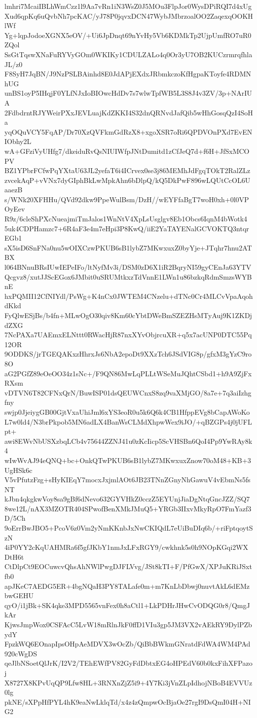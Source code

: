 lmhri7McaiIBLhWmCzz1l9Aa7vRn1iN3WsZ0J5MOu3FlpJor0WysDPiRQI7d4xUg
Xud6qpKq6uQvbNh7pcKAC/yJ78P0jqvxDCN47WybJMbrzoalOO2ZaqexqOOKHlWf
Yg+lqpJodoeXGNX5eOV/+Ui6JpDnqt69nYvHy5Vb6KDMkTp2UjpUmfRO7uR0ZQol
SsGtTqswXNaFuRYVyGOm0WKIKy1CDULZALo4q0Or3yU7OB2KUCzrmrqfhlaJL/z0
F8SyH7JqBN/J9NzPSLBAinhd8E0JdAPjEXdxJRbmkczoKfHgpaKToyfe4RDMNhUG
unBS1oyP5IHqjF0YLfNJxIoBIOwcHdDv7s7wlwTpfWB5L3S8J4v3ZV/3p+NArIUA
2FdbdrntRJYWeirPXxJEVLuajKdZKKI4S32dnQRNvdJafQib5wHhGosqQzI4SoHa
yqOQuVCY5FqAP/Dr70XzQVFkmGdRzX8+xgoXSR7oRi6QPDVOnPXd7EvENIObhy2L
wA+GFziVyUHfg7/dkeiduRvQsNIUIWfpJNtDumitd1zCfJeQ7d+f6H+JfSxMCOPV
BZ1YPbrFCfwPqYXtaU63JL2yefaT6i4ICrvex0se3j86MEMhJdFgqTOkT2RalZLz
zvcekAqP+vVNx7dyGIphBkLwMpkAhn6bDlpQ/kQ5DkPwF896wLQUtCcOL6UaaezB
s/WNk20XFHHu/QVd92dkw9PpeWulBsm/DzH//wEYFfaBgT7woH0xh+0l0VPOyEev
R9z/6cleShPXcNueajmiTmJalos1WnNtV4XpLsUsglgv8Eb1Obcs6IqnM4bWotk4
5uk4CDPHamzc7+6R4aF3e4m7eHpi3P8KwQ/iiE2YaTAYENalGCVOKTQ3ntqrEGb1
sX5isD6SnFNa0nu5wOIXCzwPKUB6sB1lybZ7MKwxuxZ0byYje+JTqhr7hnu2ATBX
l064BNnuBRsIUwIEPeIFo/ltNyfMv3i/DSM0zD6X1iR2BqryNI59gyCEnJa63YTV
Qcgvz8/xutJJScEGox6JMbit0uSRUMtkxzTdVnnE1LWn1u86bzkqRdmSmzsWYBnE
hxPQMII12CfNIYdl/PsWg+K4nCx0JWTEM4CNzelu+dTNc0Cr4MLCvVpaAqohdKkd
FyQlwESjBs/b4fn+MLwOgO30qiv8Km60cYbtDWeBmSZEZHsMTyAuj9K1ZKDjdZXG
7NcPAXa7UAEmxELNttt0RWacHjR87nxXYvObjrcuXR+q5x7acUNP0DTC55Pq12OR
9ODDKS/jrTGEQAKxzHhrxJs6NbA2epoDt9XXzTch6JSdVIG8p/gfxM3gYzC9ro8O
aG2PGfZ89eOeOO34z1sNc+/F9QN86MwLqPLLtWSeMuJQhtCSbd1+h9A9ZjFxRXsm
vDTVN6T82CFNxQrN/BuwISP01dsQEUWCnxS8zq9vaXMjGO/8a7e+7q3aiIzhgfny
swjp0JjeiygGB00GjtVxaUhiJml6xYS3eoR0u5k6Q6k4CB1HfppEVg8bCapAWoKo
L7w0ld4/N3brPkpob5MN6adLX4BanWsCLMdXhpwWex9iJO/+qBZGPs4j0jUFLpt+
awi8EWvNbUSXzbqLCb4v75644ZZNJ41u0zKcIicp5ScVHSBn6QoI4Pp9YwRAy8k4
wIwWvAJ94eQNQ+bc+OnkQTwPKUB6sB1lybZ7MKwxuxZnow70oM48+KB+3UgHSk6c
V5vPfutzFzg+sHyKIEqY7mocxJxjmlAOt6JB23TNnZGnyNhGawuV4vEbmNs5fsNT
kJbn4qkgkwVoy8sa9gBf6dNevo632GYVHkZ0cczZ5EYUnjJiaDgNtqGncJZZ/SQ7
8we12L/nAX3MZOTR404SPwofBenXMkJMuQ5+YRGb3IIxvMkyRpO7FmYazf3D/5Ch
9oErrBwJBO5+PcoV6z0Vm2yNmKKnbJxNwCKIQdL7eUiBuDIq6b/+riFptqoytSzN
4iP0YY2cKqUAHMRa6f5gfJKbY1nmJxLFxRGY9/cwkhnk5s0h9NOpKGqi2WXDtH6t
CtDlpCt9EOCuwcvQhsAhNWlPwgDJFLVvg/JSt8kTI+F/PfGwX/XPJuKRiJSxtfb0
apJKeC7AEDG5ER+4bgNQaH3PY8TALafe0m+m7KnLbDbwj0nuvtAkL6dEMzbwGEHU
qyO/i1jBk+SK4qke3MPD5565vnFex0h8aCtl1+LkPDHrJHwCvODQG0r8/QmgJkAr
KjwsJmpWox0CSFAcC5LvW18mRlnJkF0ffD1VIu3gp5JM3VX2vAEkRY9DylPZbydY
FpzkWQ6EOnapIpsOHpAeMDVX3wOcZb/QiBbBWkmGNratdFdWA4WM4PAd920cWgDS
qeJlbNSoetQlJrK/I2V2/TEhEWfPV82GyFdDbtxEG4oHPEdV60b0kxFihXFPazoj
X8727X8KPvUqQP9Lfw8HL+3RNXnZjZ5i9+4Y7Ki3jVnZLpIdhojNBoB4EVVUz0lg
pkNE/sXPpHfPYL4hK9eaNwLklqTd/x4z4zQmpwOcBjaOe27rgI9DsQmI04H+NIG2
